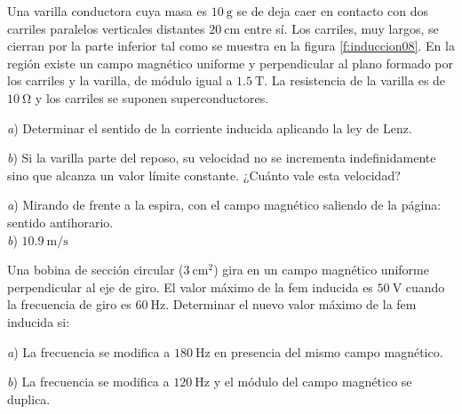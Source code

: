%
\begin{Exercise}\label{p:induccion08}
    Una varilla conductora cuya masa es $\SI{10}{\gram}$ se de deja caer en contacto con dos carriles paralelos verticales distantes $\SI{20}{\centi\metre}$ entre sí. Los carriles, muy largos, se cierran por la parte inferior tal como se muestra en la figura \ref{f:induccion08}. En la región existe un campo magnético uniforme y perpendicular al plano formado por los carriles y la varilla, de módulo igual a $\SI{1.5}{\tesla}$. La resistencia de la varilla es de $\SI{10}{\ohm}$ y los carriles se suponen superconductores.\par
    \textit{a}) Determinar el sentido de la corriente inducida aplicando la ley de Lenz.\par
    \textit{b}) Si la varilla parte del reposo, su velocidad no se incrementa indefinidamente sino que alcanza un valor límite constante. ¿Cuánto vale esta velocidad?
\end{Exercise}
\begin{Answer}
    \begin{minipage}[t]{.4\textwidth}
        \textit{a}) Mirando de frente a la espira, con el campo magnético saliendo de la página: sentido antihorario.\\ \textit{b}) $\SI{10.9}{\metre/\second}$
    \end{minipage}
\end{Answer}
%
\begin{center}
\end{center}
%
\begin{Exercise}
    Una bobina de sección circular ($\SI{3}{\centi\metre\squared}$) gira en un campo magnético uniforme perpendicular al eje de giro. El valor máximo de la fem inducida es $\SI{50}{\volt}$ cuando la frecuencia de giro es $\SI{60}{\hertz}$. Determinar el nuevo valor máximo de la fem inducida si:\par
    \textit{a}) La frecuencia se modifica a $\SI{180}{\hertz}$ en presencia del mismo campo magnético.\par
    \textit{b}) La frecuencia se modifica a $\SI{120}{\hertz}$ y el módulo del campo magnético se duplica.
\end{Exercise}
